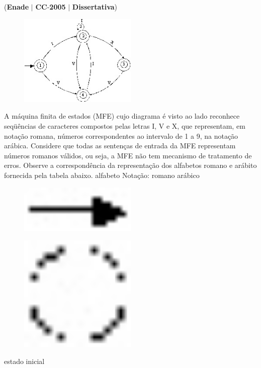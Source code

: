 \documentclass{exam}
\begin{document}
\begin{questions}
\question (\textbf{Enade} $|$ \textbf{CC}-\textbf{2005} $|$ \textbf{Dissertativa})

\begin{figure}[H]
	\begin{center}
		\includegraphics[width=0.5\textwidth]{CIENCIA_DA_COMPUTACAO_Prova2005-utf8_figuras/fig-0040.jpg}
	\end{center}
\end{figure}

A máquina finita de estados (MFE) cujo diagrama é visto ao lado
reconhece seqüências de caracteres compostos pelas letras I, V e X, que
representam, em notação romana, números correspondentes ao intervalo de
1 a 9, na notação arábica. Considere que todas as sentenças de entrada da
MFE representam números romanos válidos, ou seja, a MFE não tem
mecanismo de tratamento de erros. Observe a correspondência da
representação dos alfabetos romano e arábito fornecida pela tabela abaixo.
alfabeto Notação:
romano arábico 
  
\begin{figure}[H]
	\begin{center}
		\includegraphics[width=0.5\textwidth]{CIENCIA_DA_COMPUTACAO_Prova2005-utf8_figuras/fig-0035.jpg}
	\end{center}
\end{figure}

\begin{figure}[H]
	\begin{center}
		\includegraphics[width=0.5\textwidth]{CIENCIA_DA_COMPUTACAO_Prova2005-utf8_figuras/fig-0036.jpg}
	\end{center}
\end{figure}
estado inicial
 

\end{questions}
\end{document}

